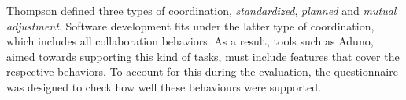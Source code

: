 \documentclass[conference]{IEEEtran}
\newcommand{\cmark}{\ding{51}}%
\begin{document}
Thompson \cite{Thompson67} defined three types of coordination, \textit{standardized}, \textit{planned} and \textit{mutual adjustment}. Software development fits under the latter type of coordination, which includes all collaboration behaviors. As a result, tools such as Aduno, aimed towards supporting this kind of tasks, must include features that cover the respective behaviors. To account for this during the evaluation, the questionnaire was designed to check how well these behaviours were supported.

%
\end{document}
